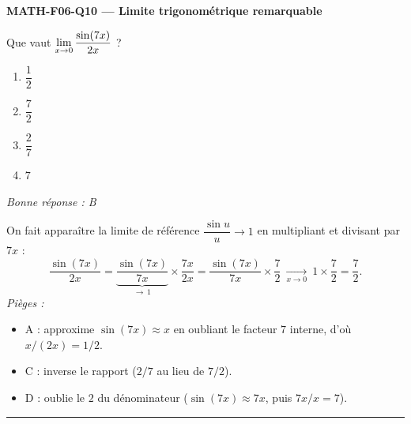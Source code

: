 \documentclass[11pt,a4paper]{article}
\begin{document}
\noindent\textbf{MATH-F06-Q10 --- Limite trigonométrique remarquable}\par
Que vaut $\displaystyle\lim_{x\to 0}\frac{\sin(7x)}{2x}$ ?
\begin{enumerate}[label=\Alph*)]
\item $\dfrac{1}{2}$
\item $\dfrac{7}{2}$
\item $\dfrac{2}{7}$
\item $7$
\end{enumerate}
\textit{Bonne réponse : B}\par
On fait apparaître la limite de référence $\dfrac{\sin u}{u}\to 1$ en multipliant et divisant par $7x$ :
\[ \frac{\sin(7x)}{2x}=\underbrace{\frac{\sin(7x)}{7x}}_{\to\,1}\times\frac{7x}{2x}=\frac{\sin(7x)}{7x}\times\frac{7}{2}\ \xrightarrow[x\to 0]{}\ 1\times\frac{7}{2}=\frac{7}{2}. \]
\textit{Pièges :}
\begin{itemize}
\item A : approxime $\sin(7x)\approx x$ en oubliant le facteur $7$ interne, d'où $x/(2x)=1/2$.
\item C : inverse le rapport ($2/7$ au lieu de $7/2$).
\item D : oublie le $2$ du dénominateur ($\sin(7x)\approx 7x$, puis $7x/x=7$).
\end{itemize}
\vspace{8pt}\hrule\vspace{8pt}
\end{document}
